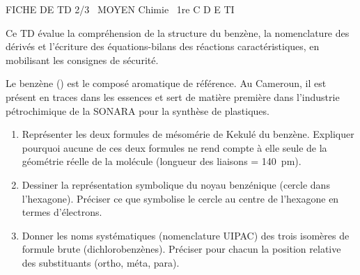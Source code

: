 \documentclass[11pt]{article}
\begin{document}
\begin{tcolorbox}[enhanced,colback=popink,colframe=popink,arc=10pt,boxrule=0pt,left=12pt,right=12pt,top=9pt,bottom=9pt]
{\color{white}\popxbold\small FICHE DE TD 2/3 \textbullet\ MOYEN \hfill Chimie \textbullet\ 1re C D E TI\par}
\end{tcolorbox}
\vspace{4pt}
Ce TD évalue la compréhension de la structure du benzène, la nomenclature des dérivés et l'écriture des équations-bilans des réactions caractéristiques, en mobilisant les consignes de sécurité.

\begin{exercice}
Le benzène () est le composé aromatique de référence. Au Cameroun, il est présent en traces dans les essences et sert de matière première dans l'industrie pétrochimique de la SONARA pour la synthèse de plastiques.
\begin{enumerate}
    \item Représenter les deux formules de mésomérie de Kekulé du benzène. Expliquer pourquoi aucune de ces deux formules ne rend compte à elle seule de la géométrie réelle de la molécule (longueur des liaisons  = \SI{140}{\pico\meter}).
    \item Dessiner la représentation symbolique du noyau benzénique (cercle dans l'hexagone). Préciser ce que symbolise le cercle au centre de l'hexagone en termes d'électrons.
    \item Donner les noms systématiques (nomenclature UIPAC) des trois isomères de formule brute  (dichlorobenzènes). Préciser pour chacun la position relative des substituants (ortho, méta, para).
\end{enumerate}
\end{exercice}
\end{document}
